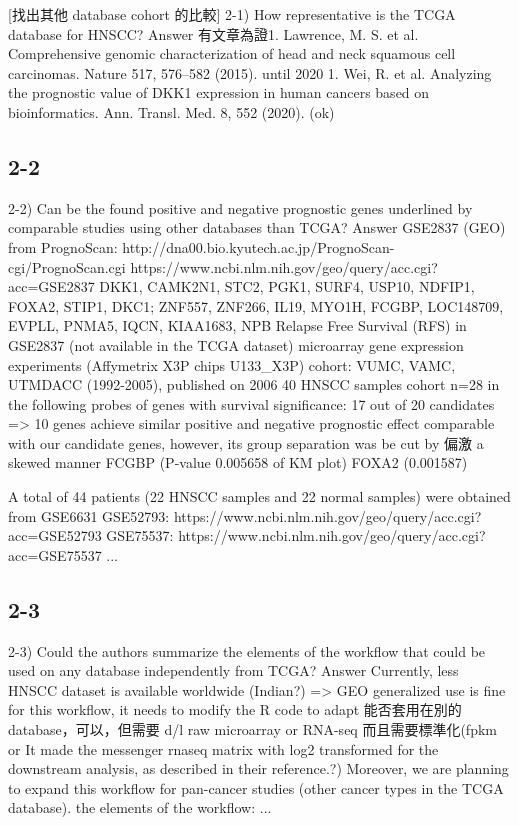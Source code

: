 \documentclass[preprint,12pt]{elsarticle}
\begin{document}
[找出其他 database cohort 的比較]
2-1) How representative is the TCGA database for HNSCC?
Answer
有文章為證1. Lawrence, M. S. et al. Comprehensive genomic characterization of head and neck squamous cell carcinomas. Nature 517, 576–582 (2015).
\cite{Lawrence2015a}
until 2020 1. Wei, R. et al. Analyzing the prognostic value of DKK1 expression in human cancers based on bioinformatics. Ann. Transl. Med. 8, 552 (2020).
\cite{Tang2019}\cite{Wei2020a}
(ok)

\subsection{2-2}
2-2) Can be the found positive and negative prognostic genes underlined by comparable studies using other databases than TCGA?
Answer
GSE2837 (GEO) from PrognoScan: http://dna00.bio.kyutech.ac.jp/PrognoScan-cgi/PrognoScan.cgi \cite{Mizuno2009a}
https://www.ncbi.nlm.nih.gov/geo/query/acc.cgi?acc=GSE2837 \cite{Chung2006}
DKK1, CAMK2N1, STC2, PGK1, SURF4, USP10, NDFIP1, FOXA2, STIP1, DKC1;
ZNF557, ZNF266, IL19, MYO1H, FCGBP, LOC148709, EVPLL, PNMA5, IQCN, KIAA1683, NPB
Relapse Free Survival (RFS) in GSE2837 (not available in the TCGA dataset)
microarray gene expression experiments (Affymetrix X3P chips U133_X3P)
cohort: VUMC, VAMC, UTMDACC (1992-2005), published on 2006
40 HNSCC samples
cohort n=28 in the following probes of genes with survival significance:
17 out of 20 candidates => 10 genes achieve similar positive and negative prognostic effect comparable with our candidate genes, however, its group separation was be cut by 偏激 a skewed manner
FCGBP (P-value 0.005658 of KM plot)
FOXA2 (0.001587)

A total of 44 patients (22 HNSCC samples and 22 normal samples) were obtained from GSE6631
GSE52793: https://www.ncbi.nlm.nih.gov/geo/query/acc.cgi?acc=GSE52793
GSE75537: https://www.ncbi.nlm.nih.gov/geo/query/acc.cgi?acc=GSE75537
...

\subsection{2-3}
2-3) Could the authors summarize the elements of the workflow that could be used on any database independently from TCGA?
Answer
Currently, less HNSCC dataset is available worldwide (Indian?) => GEO
generalized use is fine for this workflow, it needs to modify the R code to adapt 
能否套用在別的 database，可以，但需要 d/l raw microarray or RNA-seq 而且需要標準化(fpkm or  It made the messenger \acrshort{rnaseq} matrix with log2 transformed for the downstream analysis, as described in their reference\cite{RSEM2016}.?)
Moreover, we are planning to expand this workflow for pan-cancer studies (other cancer types in the TCGA database).
the elements of the workflow: ...
\end{document}
